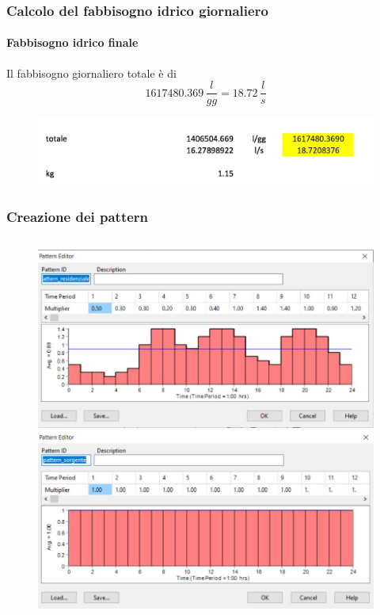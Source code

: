 \documentclass{beamer}
\begin{document}
%
\begin{frame}
 \frametitle{Calcolo del fabbisogno idrico giornaliero}
 \framesubtitle{Fabbisogno idrico finale}
Il fabbisogno giornaliero totale è di 
\[
 1617480.369\,\dfrac{l}{gg} = 18.72\,\dfrac{l}{s}
\]

   \begin{figure}
    \centering
    \includegraphics[width=.7\linewidth]{images/fabbisogno_totale}
   \end{figure}
\end{frame}
%
%
%
\begin{frame}
	\frametitle{Creazione dei pattern}
	\begin{columns}
	 \begin{column}{.5\textwidth}
	  \begin{figure}
	   \centering
	   \begin{overprint}
	   \includegraphics[width=\linewidth]{images/pattern_residenziale}
	   \onslide<2>\includegraphics[width=\linewidth]{images/pattern_sorgente}

\end{overprint}
\end{figure}
\end{column}
\end{columns}
\end{frame}
\end{document}
